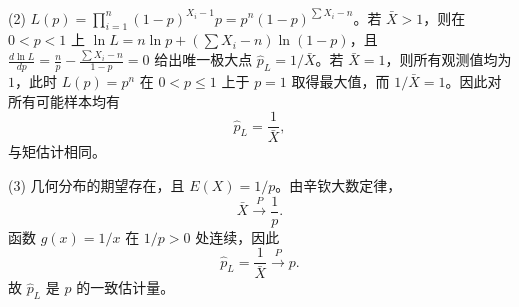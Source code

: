 (2) $L(p)=\prod_{i=1}^n (1-p)^{X_i-1}p = p^n (1-p)^{\sum X_i - n}$。若 $\bar X>1$，则在 $0<p<1$ 上
$\ln L = n\ln p + (\sum X_i - n)\ln(1-p)$，且
$\frac{d\ln L}{dp} = \frac{n}{p} - \frac{\sum X_i - n}{1-p} = 0$ 给出唯一极大点
$\hat p_L=1/\bar X$。若 $\bar X=1$，则所有观测值均为 $1$，此时 $L(p)=p^n$ 在 $0<p\leqslant1$ 上于 $p=1$ 取得最大值，而 $1/\bar X=1$。因此对所有可能样本均有
\[
\hat p_L=\frac1{\bar X},
\]
与矩估计相同。

(3) 几何分布的期望存在，且 $E(X)=1/p$。由辛钦大数定律，
\[
\bar X\xrightarrow{P}\frac1p.
\]
函数 $g(x)=1/x$ 在 $1/p>0$ 处连续，因此
\[
\hat p_L=\frac1{\bar X}\xrightarrow{P}p.
\]
故 $\hat p_L$ 是 $p$ 的一致估计量。
\else \answerarea[8] \fi
